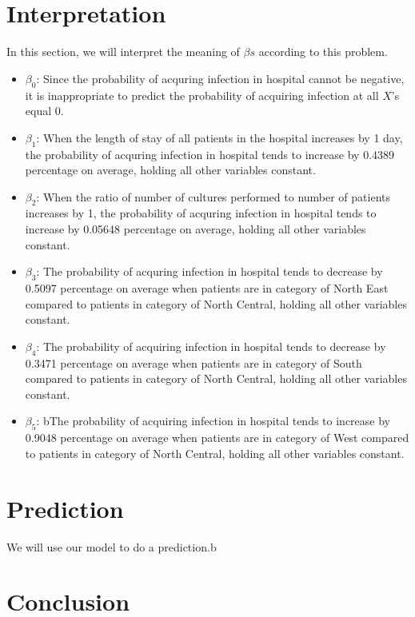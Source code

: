 \documentclass[a4paper,11pt,onecolumn,twoside]{article}
\begin{document}
\section{Interpretation}
In this section, we will interpret the meaning of $\beta s$ according to this problem.
\begin{itemize}
	\item $\beta_{0}$: Since the probability of acquring infection in hospital cannot be negative, it is inappropriate to predict the probability of acquiring infection at all $X$'s equal 0.
	\item $\beta_1$: When the length of stay of all patients in the hospital increases by 1 day, the probability of acquring infection in hospital tends to increase by 0.4389 percentage on average, holding all other variables constant.
	\item $\beta_2$: When the ratio of number of cultures performed to number of patients increases by 1, the probability of acquring infection in hospital tends to increase by 0.05648 percentage on average, holding all other variables constant.
	\item $\beta_{3}$: The probability of acquring infection in hospital tends to decrease by 0.5097 percentage on average when patients are in category of North East compared to patients in category of North Central, holding all other variables constant.
	\item $\beta_{4}$: The probability of acquiring infection in hospital tends to decrease by 0.3471 percentage on average when patients are in category of South compared to patients in category of North Central, holding all other variables constant.
	\item $\beta_{5}$: bThe probability of acquiring infection in hospital tends to increase by 0.9048 percentage on average when patients are in category of West compared to patients in category of North Central, holding all other variables constant.
	
\end{itemize}
\section{Prediction}
We will use our model to do a prediction.b
\section{Conclusion}
\end{document}
